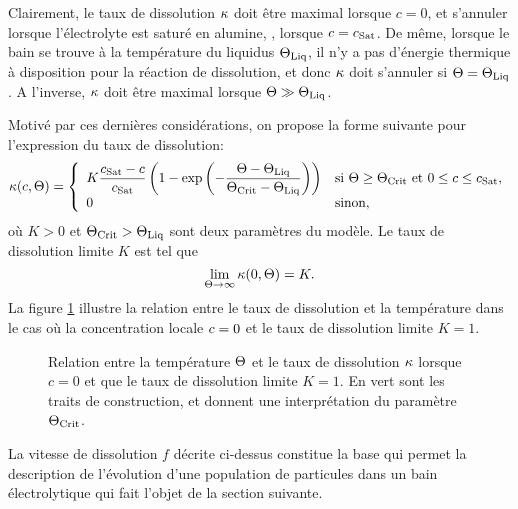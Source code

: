 Clairement, le taux de dissolution $\kappa$ doit être
maximal lorsque $c = 0$, et s'annuler lorsque l'électrolyte est saturé
en alumine, \ie, lorsque $c = c_\text{Sat}$. De même, lorsque le bain se
trouve à la température du liquidus $\Theta_\text{Liq}$, il n'y a pas d'énergie
thermique à disposition pour la réaction de dissolution, et donc
$\kappa$ doit s'annuler si $\Theta = \Theta_\text{Liq}$. A
l'inverse, $\kappa$ doit être maximal lorsque
$\Theta\gg\Theta_\text{Liq}$.

Motivé par ces dernières considérations, on propose la forme suivante
pour l'expression du taux de dissolution:
\begin{equation}\label{eq:dissolution-rate}
  \kappa(c, \Theta) =
  \left\{
  \begin{array}{ll}
    K\displaystyle\frac{c_\text{Sat} - c}{c_\text{Sat}}\left( 1 -
      \exp\left( -\displaystyle\frac{\Theta - \Theta_\text{Liq}}{\Theta_\text{Crit} -
          \Theta_\text{Liq}} \right) \right) & \text{si }\Theta \geq \Theta_\text{Crit}\text{ et }
    0\leq c
    \leq c_\text{Sat},\\
    0                                     & \text{sinon,}
  \end{array}
  \right.
\end{equation}
où $K > 0$ et $\Theta_\text{Crit} > \Theta_\text{Liq}$ sont deux paramètres du modèle. Le taux
de dissolution limite $K$ est tel que
\begin{equation}
  \lim_{\Theta \to\infty}\kappa(0, \Theta) = K.
\end{equation}
La figure \ref{fig:diss-rate} illustre la relation entre le taux de
dissolution et la température dans le cas où la concentration locale
$c = 0$ et le taux de dissolution limite $K = 1$.

\begin{figure}[h]
  \begin{center}
    
    \caption{Relation entre la température $\Theta$ et le taux de
      dissolution $\kappa$ lorsque $c = 0$ et que le taux
      de dissolution limite $K = 1$. En vert sont les traits de
      construction, et donnent une interprétation du paramètre
      $\Theta_\text{Crit}$.}
    \label{fig:diss-rate}
  \end{center}
\end{figure}

La vitesse de dissolution $f$ décrite ci-dessus constitue la base qui
permet la description de l'évolution d'une population de particules
dans un bain électrolytique qui fait l'objet de la section suivante.

